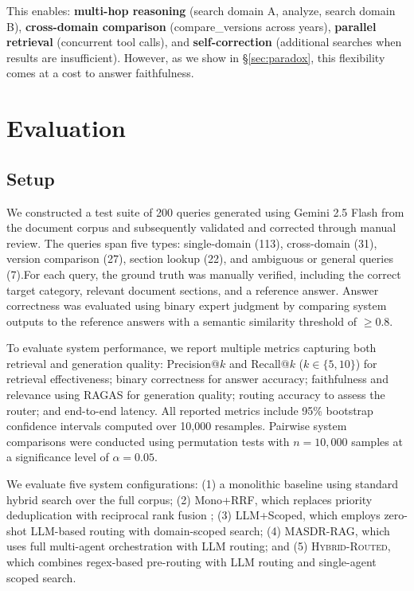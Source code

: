 \documentclass{article}
\newcommand{\systemname}{\textsc{MASDR-RAG}}
\newcommand{\hybridname}{\textsc{Hybrid-Routed}}
\newcommand{\numQueries}{200}
\begin{document}
This enables: \textbf{multi-hop reasoning} (search domain A, analyze, search domain B), \textbf{cross-domain comparison} (compare\_versions across years), \textbf{parallel retrieval} (concurrent tool calls), and \textbf{self-correction} (additional searches when results are insufficient). However, as we show in \S\ref{sec:paradox}, this flexibility comes at a cost to answer faithfulness.


\section{Evaluation}
\label{sec:evaluation}

\subsection{Setup}


We constructed a test suite of \numQueries{} queries generated using Gemini 2.5 Flash from the document corpus and subsequently validated and corrected through manual review. The queries span five types: single-domain (113), cross-domain (31), version comparison (27), section lookup (22), and ambiguous or general queries (7).For each query, the ground truth was manually verified, including the correct target category, relevant document sections, and a reference answer. Answer correctness was evaluated using binary expert judgment by comparing system outputs to the reference answers with a semantic similarity threshold of $\geq 0.8$.

To evaluate system performance, we report multiple metrics capturing both retrieval and generation quality: Precision@$k$ and Recall@$k$ ($k \in \{5, 10\}$) for retrieval effectiveness; binary correctness for answer accuracy; faithfulness and relevance using RAGAS for generation quality; routing accuracy to assess the router; and end-to-end latency. All reported metrics include 95\% bootstrap confidence intervals computed over 10,000 resamples. Pairwise system comparisons were conducted using permutation tests with $n = 10{,}000$ samples at a significance level of $\alpha = 0.05$.

We evaluate five system configurations: (1) a monolithic baseline using standard hybrid search over the full corpus; (2) Mono+RRF, which replaces priority deduplication with reciprocal rank fusion \cite{cormack2009rrf}; (3) LLM+Scoped, which employs zero-shot LLM-based routing with domain-scoped search; (4) \systemname{}, which uses full multi-agent orchestration with LLM routing; and (5) \hybridname{}, which combines regex-based pre-routing with LLM routing and single-agent scoped search.
\end{document}
